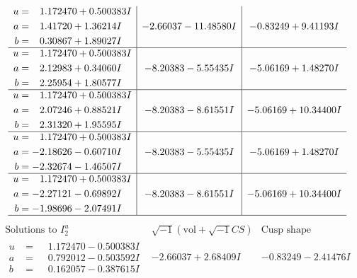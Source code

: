 \documentclass[1p]{elsarticle_modified}
\theoremstyle{definition}
\newcommand{\I}{\sqrt{-1}}
\begin{document}
$$\begin{array}{c|c|c}
\begin{aligned}
u &= \phantom{-}1.172470 + 0.500383 I \\
a &= \phantom{-}1.41720 + 1.36214 I \\
b &= \phantom{-}0.30867 + 1.89027 I\end{aligned}
 & -2.66037 - 11.48580 I & -0.83249 + 9.41193 I \\ \hline\begin{aligned}
u &= \phantom{-}1.172470 + 0.500383 I \\
a &= \phantom{-}2.12983 + 0.34060 I \\
b &= \phantom{-}2.25954 + 1.80577 I\end{aligned}
 & -8.20383 - 5.55435 I & -5.06169 + 1.48270 I \\ \hline\begin{aligned}
u &= \phantom{-}1.172470 + 0.500383 I \\
a &= \phantom{-}2.07246 + 0.88521 I \\
b &= \phantom{-}2.31320 + 1.95595 I\end{aligned}
 & -8.20383 - 8.61551 I & -5.06169 + 10.34400 I \\ \hline\begin{aligned}
u &= \phantom{-}1.172470 + 0.500383 I \\
a &= -2.18626 - 0.60710 I \\
b &= -2.32674 - 1.46507 I\end{aligned}
 & -8.20383 - 5.55435 I & -5.06169 + 1.48270 I \\ \hline\begin{aligned}
u &= \phantom{-}1.172470 + 0.500383 I \\
a &= -2.27121 - 0.69892 I \\
b &= -1.98696 - 2.07491 I\end{aligned}
 & -8.20383 - 8.61551 I & -5.06169 + 10.34400 I\\
 \hline 
 \end{array}$$\newpage$$\begin{array}{c|c|c}  
\text{Solutions to }I^u_{2}& \I (\text{vol} + \sqrt{-1}CS) & \text{Cusp shape}\\
 \hline 
\begin{aligned}
u &= \phantom{-}1.172470 - 0.500383 I \\
a &= \phantom{-}0.792012 - 0.503592 I \\
b &= \phantom{-}0.162057 - 0.387615 I\end{aligned}
 & -2.66037 + 2.68409 I & -0.83249 - 2.41476 I \\ \hline\begin{aligned}

\end{aligned}
\end{array}$$
\end{document}
